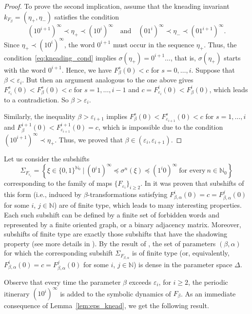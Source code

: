 \documentclass[10pt,reqno]{amsart}
\theoremstyle{plain}
\theoremstyle{assumption}
\theoremstyle{notation}
\theoremstyle{claim}
\theoremstyle{conj}
\theoremstyle{theorem}
\theoremstyle{proposition}
\theoremstyle{corollary}
\begin{document}
\begin{proof}
To prove the second implication, assume that the kneading invariant $k_{F_{\beta}}=(\eta_+,\eta_-)$ satisfies the condition
$$   (10^{i+1})^\infty\prec\eta_+\prec(10^i)^\infty\quad\text{and}\quad(01^{i})^\infty\prec\eta_-\prec(01^{i+1})^\infty.
$$
Since $\eta_+\prec(10^i)^\infty$, the word $0^{i+1}$ must occur in the sequence $\eta_+$. Thus, the condition~\eqref{eq:kneading_cond} implies $\sigma(\eta_+)=0^{i+1}\ldots$, that is, $\sigma(\eta_+)$ starts with the word $0^{i+1}$. Hence, we have $F^s_{\beta}(0)<c$ for $s=0,\ldots,i$. Suppose that $\beta<\varepsilon_i$. But then an argument analogous to the one above gives $F^s_{\varepsilon_i}(0)<F^s_{\beta}(0)<c$ for $s=1,\ldots,i-1$ and $c=F^i_{\varepsilon_i}(0)<F^i_{\beta}(0)$, which leads to a contradiction. So $\beta>\varepsilon_i$.

Similarly, the inequality $\beta>\varepsilon_{i+1}$ implies $F^s_{\beta}(0)<F^s_{\varepsilon_{i+1}}(0)<c$ for $s=1,\ldots,i$ and $F^{i+1}_{\beta}(0)<F^{i+1}_{\varepsilon_{i+1}}(0)=c$, which is impossible due to the condition $(10^{i+1})^\infty\prec\eta_+$. Thus, we proved that $\beta\in(\varepsilon_i,\varepsilon_{i+1})$.
\end{proof}

Let us consider the subshifts 
$$
\Sigma_{F_{\varepsilon_i}}=\left\{\xi\in\{0,1\}^{\mathbb{N}_0}\:|\: (0^i1)^\infty\preccurlyeq\sigma^n(\xi)\preccurlyeq(1^i0)^\infty\ \text{for every}\ n\in\mathbb{N}_0\right\}
$$
corresponding to the family of maps $\{F_{\varepsilon_i}\}_{i\geq2}$. In \cite{BiSS} it was proven that subshifts of this form (i.e., induced by $\beta$-transformations satisfying $F^i_{\beta,\alpha}(0)=c=F^j_{\beta,\alpha}(0)$ for some $i$, $j\in\mathbb{N}$) are of finite type, which leads to many interesting properties. Each such subshift can be defined by a finite set of forbidden words and represented by a finite oriented graph, or a binary adjacency matrix. Moreover, subshifts of finite type are exactly those subshifts that have the shadowing property (see more details in \cite{Kurka}). By the result of \cite{BiSSS}, the set of parameters $(\beta,\alpha)$ for which the corresponding subshift $\Sigma_{F_{\beta,\alpha}}$ is of finite type (or, equivalently, $F^i_{\beta,\alpha}(0)=c=F^j_{\beta,\alpha}(0)$ for some $i$, $j\in\mathbb{N}$) is dense in the parameter space $\Delta$.

Observe that every time the parameter $\beta$ exceeds $\varepsilon_i$, for $i\geq2$, the periodic itinerary $(10^i)^\infty$ is added to the symbolic dynamics of $F_{\beta}$. As an immediate consequence of Lemma~\ref{lem:eps_knead}, we get the following result.
\end{document}
